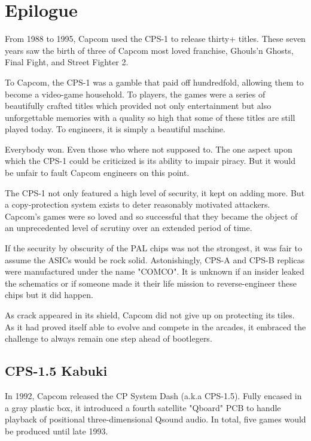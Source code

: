 







\section{Epilogue}
From 1988 to 1995, Capcom used the CPS-1 to release thirty+ titles. These seven years saw the birth of three of Capcom most loved franchise, Ghouls’n Ghosts, Final Fight, and Street Fighter 2.

To Capcom, the CPS-1 was a gamble that paid off hundredfold, allowing them to become a video-game household. To players, the games were a series of beautifully crafted titles which provided not only entertainment but also unforgettable memories with a quality so high that some of these titles are still played today. To engineers, it is simply a beautiful machine.

Everybody won. Even those who where not supposed to. The one aspect upon which the CPS-1 could be criticized is its ability to impair piracy. But it would be unfair to fault Capcom engineers on this point.

 The CPS-1 not only featured a high level of security, it kept on adding more. But a copy-protection system exists to deter reasonably motivated attackers. Capcom's games were so loved and so successful that they became the object of an unprecedented level of scrutiny over an extended period of time.

If the security by obscurity of the PAL chips was not the strongest, it was fair to assume the ASICs would be rock solid. Astonishingly, CPS-A and CPS-B replicas were manufactured under the name "COMCO"\cite{arcadeHackerCPS1}. It is unknown if an insider leaked the schematics or if someone made it their life mission to reverse-engineer these chips but it did happen.

As crack appeared in its shield, Capcom did not give up on protecting its tiles. As it had proved itself able to evolve and compete in the arcades, it  embraced the challenge to always remain one step ahead of bootlegers.

\subsection{CPS-1.5 Kabuki}
In 1992, Capcom released the CP System Dash (a.k.a CPS-1.5). Fully encased in a gray plastic box, it introduced a fourth satellite "Qboard" PCB to handle playback of positional three-dimensional Qsound audio. In total, five games would be produced until late 1993.

